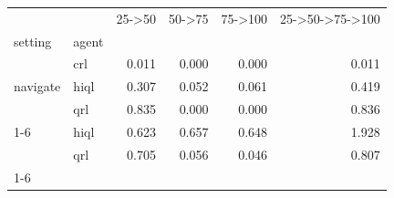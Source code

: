 \begin{tabular}{llrrrr}
\toprule
 &  & 25->50 & 50->75 & 75->100 & 25->50->75->100 \\
setting & agent &  &  &  &  \\
\midrule
\multirow[t]{3}{*}{navigate} & crl & 0.011 & 0.000 & 0.000 & 0.011 \\
 & hiql & 0.307 & 0.052 & 0.061 & 0.419 \\
 & qrl & 0.835 & 0.000 & 0.000 & 0.836 \\
\cline{1-6}
\multirow[t]{2}{*}{scheduled_exploration} & hiql & 0.623 & 0.657 & 0.648 & 1.928 \\
 & qrl & 0.705 & 0.056 & 0.046 & 0.807 \\
\cline{1-6}
\bottomrule
\end{tabular}
